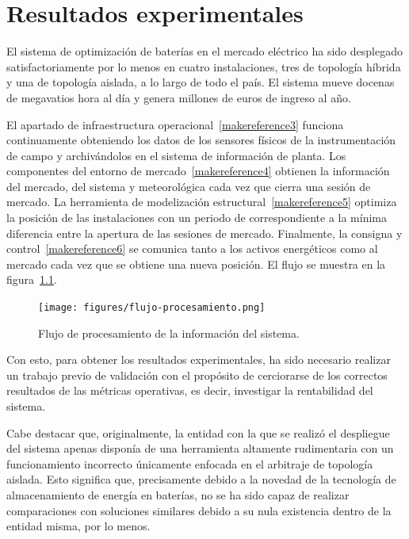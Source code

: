 \cleardoublepage

\chapter{Resultados experimentales}
\label{makereference7}

El sistema de optimización de baterías en el mercado eléctrico ha sido desplegado satisfactoriamente por lo menos en cuatro instalaciones, tres de topología híbrida y una de topología aislada, a lo largo de todo el país. El sistema mueve docenas de megavatios hora al día y genera millones de euros de ingreso al año.

El apartado de infraestructura operacional~\ref{makereference3} funciona continuamente obteniendo los datos de los sensores físicos de la instrumentación de campo y archivándolos en el sistema de información de planta. Los componentes del entorno de mercado~\ref{makereference4} obtienen la información del mercado, del sistema y meteorológica cada vez que cierra una sesión de mercado. La herramienta de modelización estructural~\ref{makereference5} optimiza la posición de las instalaciones con un periodo de correspondiente a la mínima diferencia entre la apertura de las sesiones de mercado. Finalmente, la consigna y control~\ref{makereference6} se comunica tanto a los activos energéticos como al mercado cada vez que se obtiene una nueva posición. El flujo se muestra en la figura~\ref{fig:flujo-procesamiento}.

\begin{figure}
  \centering
  \texttt{[image: figures/flujo-procesamiento.png]}
  \caption{Flujo de procesamiento de la información del sistema.}
  \label{fig:flujo-procesamiento}
\end{figure}

Con esto, para obtener los resultados experimentales, ha sido necesario realizar un trabajo previo de validación con el propósito de cerciorarse de los correctos resultados de las métricas operativas, es decir, investigar la rentabilidad del sistema.

Cabe destacar que, originalmente, la entidad con la que se realizó el despliegue del sistema apenas disponía de una herramienta altamente rudimentaria con un funcionamiento incorrecto únicamente enfocada en el arbitraje de topología aislada. Esto significa que, precisamente debido a la novedad de la tecnología de almacenamiento de energía en baterías, no se ha sido capaz de realizar comparaciones con soluciones similares debido a su nula existencia dentro de la entidad misma, por lo menos.

